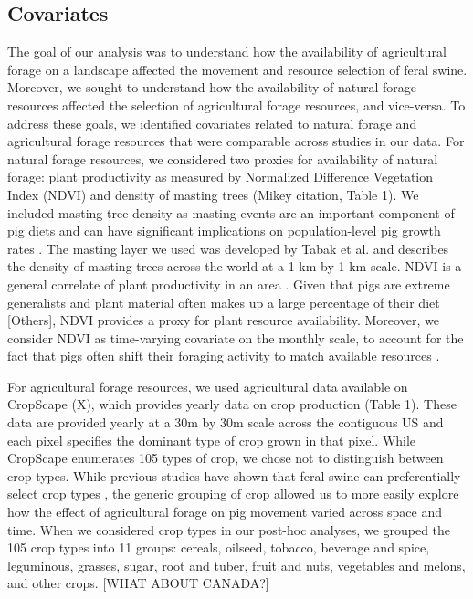 \documentclass[a4paper]{article}
\begin{document}
\subsection*{Covariates}

The goal of our analysis was to understand how the availability of agricultural forage on a landscape affected the movement and resource selection of feral swine.  Moreover, we sought to understand how the availability of natural forage resources affected the selection of agricultural forage resources, and vice-versa. To address these goals, we identified covariates related to natural forage and agricultural forage resources that were comparable across studies in our data.  For natural forage resources, we considered two proxies for availability of natural forage: plant productivity as measured by Normalized Difference Vegetation Index (NDVI) and density of masting trees (Mikey citation, Table 1). We included masting tree density as masting events are an important component of pig diets and can have significant implications on population-level pig growth rates \citep[e.g.][]{Bieber2005}.  The masting layer we used was developed by Tabak et al. and describes the density of masting trees across the world at a 1 km by 1 km scale.  NDVI is a general correlate of plant productivity in an area \citep{Pettorelli2005}.  Given that pigs are extreme generalists and plant material often makes up a large percentage of their diet \citep{Mayer2009} [Others], NDVI provides a proxy for plant resource availability.  Moreover, we consider NDVI as time-varying covariate on the monthly scale, to account for the fact that pigs often shift their foraging activity to match available resources \citep{Mayer2009}.

For agricultural forage resources, we used agricultural data available on CropScape (X), which provides yearly data on crop production (Table 1). These data are provided yearly at a 30m by 30m scale across the contiguous US and each pixel specifies the dominant type of crop grown in that pixel.  While CropScape enumerates 105 types of crop, we chose not to distinguish between crop types. While previous studies have shown that feral swine can preferentially select crop types \citep[e.g.][]{Herrero2006}, the generic grouping of crop allowed us to more easily explore how the effect of agricultural forage on pig movement varied across space and time.  When we considered crop types in our post-hoc analyses, we grouped the 105 crop types into 11 groups: cereals, oilseed, tobacco, beverage and spice, leguminous, grasses, sugar, root and tuber, fruit and nuts, vegetables and melons, and other crops. [WHAT ABOUT CANADA?]
\end{document}
